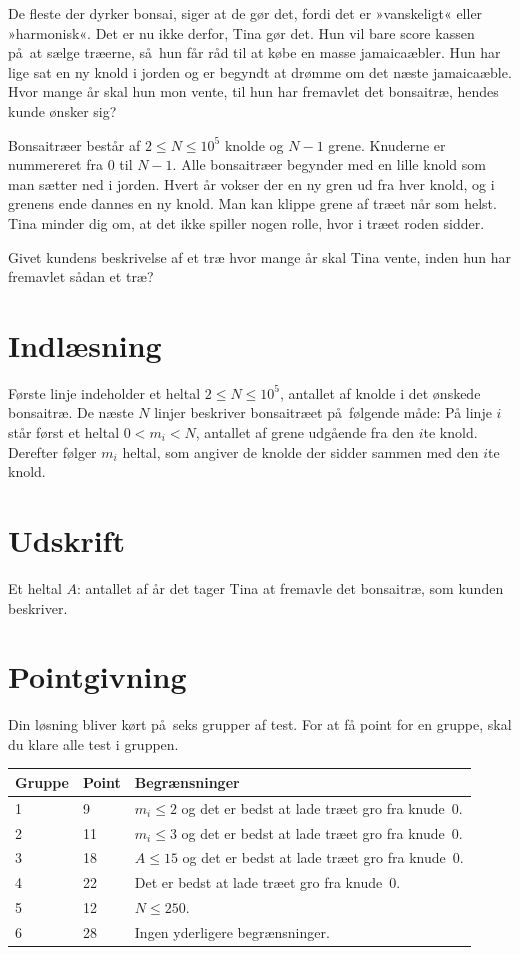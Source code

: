 
De fleste der dyrker bonsai, siger at de gør det, fordi det er »vanskeligt« eller »harmonisk«.
Det er nu ikke derfor, Tina gør det.
Hun vil bare score kassen på at sælge træerne, så hun får råd til at købe en masse jamaicaæbler.
Hun har lige sat en ny knold i jorden og er begyndt at drømme om det næste jamaicaæble.
Hvor mange år skal hun mon vente, til hun har fremavlet det bonsaitræ, hendes kunde ønsker sig?

Bonsaitræer består af $2\leq N \leq 10^5$ knolde og $N-1$ grene.
Knuderne er nummereret fra $0$ til $N-1$. 
Alle bonsaitræer begynder med en lille knold som man sætter ned i jorden.
Hvert år vokser der en ny gren ud fra hver knold, og i grenens ende dannes en ny knold.
Man kan klippe grene af træet når som helst. 
Tina minder dig om, at det ikke spiller nogen rolle, hvor i træet roden sidder.

Givet kundens beskrivelse af et træ hvor mange år skal Tina vente, inden hun har fremavlet sådan et træ?

\section*{Indlæsning}

Første linje indeholder et heltal $2\leq N\leq 10^5$, antallet af knolde i det ønskede bonsaitræ.
De næste $N$ linjer beskriver bonsaitræet på følgende måde:
På linje $i$ står først et heltal $0 < m_i < N$, antallet af grene udgående fra den $i$te knold. 
Derefter følger $m_i$ heltal, som angiver de knolde der sidder sammen med den $i$te knold.

\section*{Udskrift}

Et heltal $A$: antallet af år det tager Tina at fremavle det bonsaitræ, som kunden beskriver.

\section*{Pointgivning}

Din løsning bliver kørt på seks grupper af test.
For at få point for en gruppe, skal du klare alle test i gruppen. 

\medskip\noindent
\begin{tabular}{ l  l  l }
Gruppe & Point      & Begrænsninger \\ \hline
1      &  9         & $m_i\leq 2$ og det er bedst at lade træet gro fra knude~0.\\ 
2      & 11         & $m_i \leq 3$ og det er bedst at lade træet gro fra knude~0. \\ 
3      & 18         & $A \leq 15$ og det er bedst at lade træet gro fra knude~0. \\ 
4      & 22         & Det er bedst at lade træet gro fra knude~0. \\ 
5      & 12         & $N \leq 250$. \\
6      & 28         & Ingen yderligere begrænsninger. 
\end{tabular}

